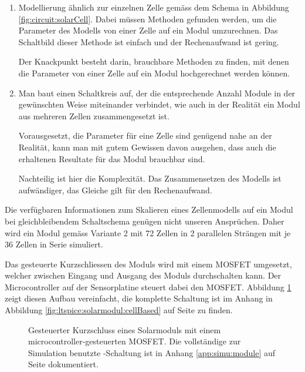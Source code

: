 \begin{enumerate}
    \item
        Modellierung  \"ahnlich  zur  einzelnen   Zelle  gem\"ass  dem  Schema
        in  Abbildung   \ref{fig:circuit:solarCell}. Dabei  m\"ussen  Methoden
        gefunden werden, um die Parameter des  Modells von einer Zelle auf ein
        Modul umzurechnen.  Das Schaltbild dieser  Methode ist einfach und der
        Rechenaufwand ist gering.

        Der Knackpunkt besteht darin, brauchbare Methoden zu finden, mit denen
        die  Parameter von  einer  Zelle auf  ein  Modul hochgerechnet  werden
        k\"onnen.
    \item
        Man baut einen Schaltkreis auf, der die entsprechende Anzahl Module in
        der  gew\"unschten  Weise  miteinander  verbindet,  wie  auch  in  der
        Realit\"at ein Modul aus mehreren Zellen zusammengesetzt ist.

        Vorausgesetzt, die Parameter f\"ur eine  Zelle sind gen\"ugend nahe an
        der Realit\"at, kann man mit  gutem Gewissen davon ausgehen, dass auch
        die erhaltenen Resultate f\"ur das Modul brauchbar sind.

        Nachteilig ist hier die  Komplexit\"at. Das Zusammensetzen des Modells
        ist aufw\"andiger, das Gleiche gilt f\"ur den Rechenaufwand.
\end{enumerate}

Die  verf\"ugbaren   Informationen  zum  Skalieren  eines   Zellenmodells  auf
ein   Modul  bei   gleichbleibendem  Schaltschema   gen\"ugen  nicht   unseren
Anspr\"uchen. Daher wird  ein Modul  gem\"ass Variante  2 mit  72 Zellen  in 2
parallelen Str\"angen mit je 36  Zellen in Serie simuliert.

Das  gesteuerte Kurzschliessen  des Moduls  wird mit  einem MOSFET  umgesetzt,
welcher  zwischen  Eingang  und  Ausgang des  Moduls  durchschalten  kann. Der
Microcontroller  auf der  Sensorplatine  steuert  dabei den  MOSFET. Abbildung
\ref{fig:module:mosfet:simple} zeigt diesen  Aufbau vereinfacht, die komplette
Schaltung  ist im  Anhang in  Abbildung \ref{fig:ltspice:solarmodul:cellBased}
auf Seite \pageref{fig:ltspice:solarmodul:cellBased} zu finden.

\begin{figure}[h!tb]
    \centering
    
    \caption{%
        Gesteuerter     Kurzschluss     eines    Solarmoduls     mit     einem
        microcontroller-gesteuerten MOSFET. Die  vollst\"andige zur Simulation
        benutzte -Schaltung ist  in Anhang \ref{app:simu:module}
        auf Seite \pageref{fig:ltspice:solarmodul:cellBased} dokumentiert.%
    }
    \label{fig:module:mosfet:simple}
\end{figure}



